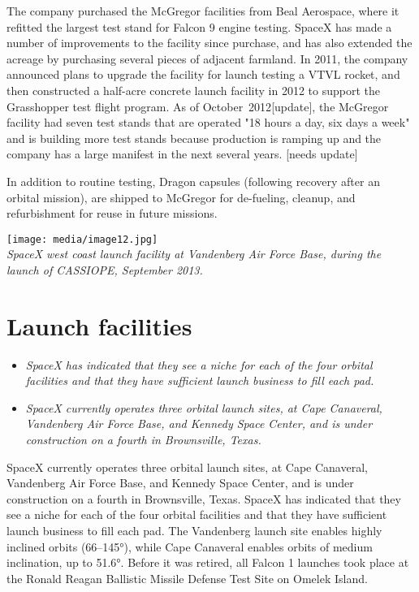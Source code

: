 The company purchased the McGregor facilities from Beal Aerospace, where
it refitted the largest test stand for Falcon 9 engine testing. SpaceX
has made a number of improvements to the facility since purchase, and
has also extended the acreage by purchasing several pieces of adjacent
farmland. In 2011, the company announced plans to upgrade the facility
for launch testing a VTVL rocket, and then constructed a half-acre
concrete launch facility in 2012 to support the Grasshopper test flight
program. As of October~2012{[}update{]}, the McGregor facility had seven
test stands that are operated "18 hours a day, six days a week" and is
building more test stands because production is ramping up and the
company has a large manifest in the next several years. {[}needs
update{]}

In addition to routine testing, Dragon capsules (following recovery
after an orbital mission), are shipped to McGregor for de-fueling,
cleanup, and refurbishment for reuse in future missions.

\texttt{[image: media/image12.jpg]}\\
\emph{SpaceX west coast launch facility at Vandenberg Air Force Base,
during the launch of CASSIOPE, September 2013.}

\section{Launch facilities}\label{launch-facilities}

\begin{itemize}
\item
  \emph{SpaceX has indicated that they see a niche for each of the four
  orbital facilities and that they have sufficient launch business to
  fill each pad.}
\item
  \emph{SpaceX currently operates three orbital launch sites, at Cape
  Canaveral, Vandenberg Air Force Base, and Kennedy Space Center, and is
  under construction on a fourth in Brownsville, Texas.}
\end{itemize}

SpaceX currently operates three orbital launch sites, at Cape Canaveral,
Vandenberg Air Force Base, and Kennedy Space Center, and is under
construction on a fourth in Brownsville, Texas. SpaceX has indicated
that they see a niche for each of the four orbital facilities and that
they have sufficient launch business to fill each pad. The Vandenberg
launch site enables highly inclined orbits (66--145°), while Cape
Canaveral enables orbits of medium inclination, up to 51.6°. Before it
was retired, all Falcon 1 launches took place at the Ronald Reagan
Ballistic Missile Defense Test Site on Omelek Island.

